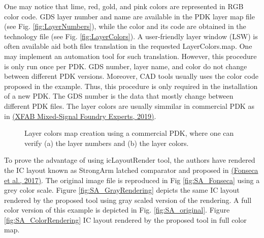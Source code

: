 \documentclass[10pt,a4paper,onecolumn]{article}
\begin{document}
One may notice that lime, red, gold, and pink colors are represented in
RGB color code. GDS layer number and name are available in the PDK layer
map file (see Fig. \ref{fig:LayerNumbers}), while the color and its code are obtained in
the technology file (see Fig. \ref{fig:LayerColors}). A user-friendly layer window (LSW)
is often available aid both files translation in the requested
LayerColors.map. One may implement an automation tool for such
translation. However, this procedure is only run once per PDK. GDS
number, layer name, and color do not change between different PDK
versions. Moreover, CAD tools usually uses the color code proposed in
the example. Thus, this procedure is only required in the installation
of a new PDK. The GDS number is the data that mostly change between
different PDK files. The layer colors are usually simmilar in commercial PDK as in \hyperlink{ref-XFAB2019}{(XFAB Mixed-Signal Foundry Experts, 2019)}.
\begin{figure}[ht]
 \begin{center}
   \caption{Layer colors map creation using a commercial PDK, where one can verify (a) the layer numbers and (b) the layer colors.}
 \end{center}
\end{figure}

To prove the advantage of using icLayoutRender tool, the authors have
rendered the IC layout known as StrongArm latched comparator and
proposed in \hyperlink{ref-Fonseca2017}{(Fonseca et al., 2017)}. The original image file is
reproduced in Fig \ref{fig:SA_Fonseca} using a grey color scale. Figure \ref{fig:SA_GrayRendering} depicts the
same IC layout rendered by the proposed tool using gray scaled version
of the rendering. A full color version of this example is depicted in
Fig. \ref{fig:SA_original}. Figure \ref{fig:SA_ColorRendering} IC layout rendered by the proposed tool in full
color map.
\end{document}
